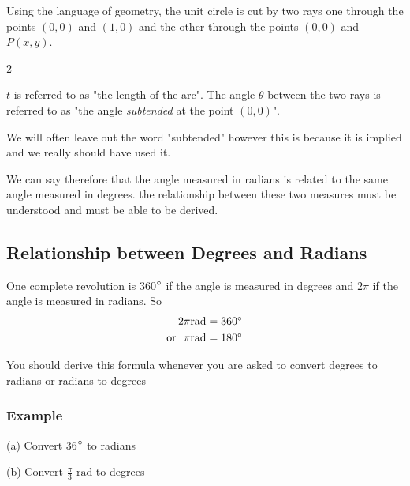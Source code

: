Using the language of geometry, the unit circle is cut by two rays one through the points $\left (0 ,0\right )$ and $\left (1 ,0\right )$ and the other through the points $\left (0 ,0\right )$ and $P \left (x ,y\right )$.  
\columnsep =30pt
\begin {multicols}{2}
   
\setlength\fboxrule{0in}\setlength\fboxsep{0.2in}

$t$ is referred to as "the length of the arc". The
angle $\theta $ between the two rays is referred to as "the angle \emph{subtended} at the point $\left (0 ,0\right )$". 

We will often leave out the word "subtended"
however this is because it is implied and we really should have used it. 


\end {multicols}


We can say therefore that the angle measured in radians is related to the same angle measured in degrees. the
relationship between these two measures must be understood and must be able to be derived. 

\subsection{Relationship between Degrees and Radians}
One complete revolution is 360$\mbox{{\ensuremath{{}^\circ}}}$ if the angle is measured in degrees and $2 \pi $ if the angle is measured in radians. So
\begin{align*}2 \pi \text{}\mbox{rad} &  =  360 \mbox{{\ensuremath{{}^\circ}}} \\
\text{or\  \ }\pi \text{}\mbox{rad} &  =  180 \mbox{{\ensuremath{{}^\circ}}}\end{align*}

You should derive this formula whenever you are asked to convert degrees to radians or radians
to degrees 

\subsubsection{Example}
(a) Convert 36$\mbox{{\ensuremath{{}^\circ}}}$ to radians 

(b) Convert $\frac{\pi }{3}$ $\mbox{rad}$ to degrees 

